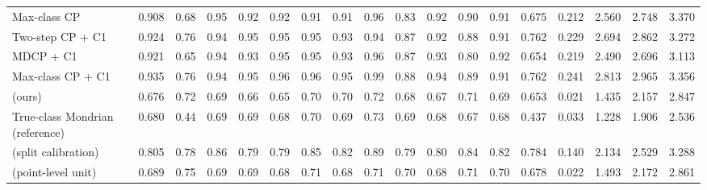 \begin{table}[!htbp]
{\begin{tabular}{lccccccccccccccccc}
Max-class CP & 0.908 & 0.68 & 0.95 & 0.92 & 0.92 & 0.91 & 0.91 & 0.96 & 0.83 & 0.92 & 0.90 & 0.91 & 0.675 & 0.212 & 2.560 & 2.748 & 3.370 \\
Two-step CP + C1 & 0.924 & 0.76 & 0.94 & 0.95 & 0.95 & 0.95 & 0.93 & 0.94 & 0.87 & 0.92 & 0.88 & 0.91 & 0.762 & 0.229 & 2.694 & 2.862 & 3.272 \\
MDCP + C1 & 0.921 & 0.65 & 0.94 & 0.93 & 0.95 & 0.95 & 0.93 & 0.96 & 0.87 & 0.93 & 0.80 & 0.92 & 0.654 & 0.219 & 2.490 & 2.696 & 3.113 \\
Max-class CP + C1 & 0.935 & 0.76 & 0.94 & 0.95 & 0.96 & 0.96 & 0.95 & 0.99 & 0.88 & 0.94 & 0.89 & 0.91 & 0.762 & 0.241 & 2.813 & 2.965 & 3.356 \\
\gamut{} (ours) & 0.676 & 0.72 & 0.69 & 0.66 & 0.65 & 0.70 & 0.70 & 0.72 & 0.68 & 0.67 & 0.71 & 0.69 & 0.653 & 0.021 & 1.435 & 2.157 & 2.847 \\
True-class Mondrian (reference) & 0.680 & 0.44 & 0.69 & 0.69 & 0.68 & 0.70 & 0.69 & 0.73 & 0.69 & 0.68 & 0.67 & 0.68 & 0.437 & 0.033 & 1.228 & 1.906 & 2.536 \\
\gamut{} (split calibration) & 0.805 & 0.78 & 0.86 & 0.79 & 0.79 & 0.85 & 0.82 & 0.89 & 0.79 & 0.80 & 0.84 & 0.82 & 0.784 & 0.140 & 2.134 & 2.529 & 3.288 \\
\gamut{} (point-level unit) & 0.689 & 0.75 & 0.69 & 0.69 & 0.68 & 0.71 & 0.68 & 0.71 & 0.70 & 0.68 & 0.71 & 0.70 & 0.678 & 0.022 & 1.493 & 2.172 & 2.861 \\
\bottomrule
\end{tabular}}
\end{table}

